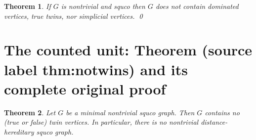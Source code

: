 \documentclass[10pt,a4paper]{amsart}
\theoremstyle{plain}
\newtheorem{theorem}{Theorem}[section]
\begin{document}
\begin{theorem}\label{thm:notruetwins}
  If $G$ is nontrivial and squco then $G$ does not contain dominated vertices, true twins, nor simplicial vertices. \qed
\end{theorem}


\section{The counted unit: Theorem (source label thm:notwins) and its complete original proof}

\begin{theorem}\label{thm:notwins}
  Let $G$ be a minimal nontrivial squco graph. 
  Then $G$ contains no (true or false) twin vertices. 
  In particular, there is no nontrivial distance-hereditary squco graph.
\end{theorem}
\end{document}
